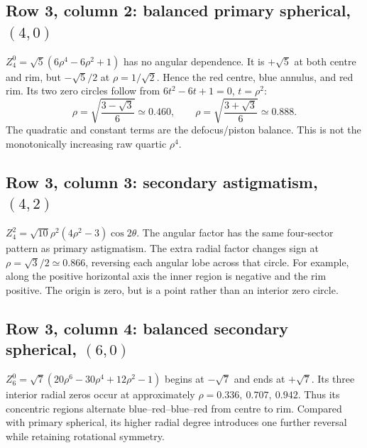 \subsection*{Row 3, column 2: balanced primary spherical, $(4,0)$}
$Z_4^0=\sqrt5(6\rho^4-6\rho^2+1)$ has no angular dependence. It is $+\sqrt5$ at both centre and rim, but $-\sqrt5/2$ at $\rho=1/\sqrt2$. Hence the red centre, blue annulus, and red rim. Its two zero circles follow from $6t^2-6t+1=0$, $t=\rho^2$:
\begin{equation}
\rho=\sqrt{\frac{3-\sqrt3}{6}}\simeq0.460,
\qquad \rho=\sqrt{\frac{3+\sqrt3}{6}}\simeq0.888.
\end{equation}
The quadratic and constant terms are the defocus/piston balance. This is not the monotonically increasing raw quartic $\rho^4$.

\subsection*{Row 3, column 3: secondary astigmatism, $(4,2)$}
$Z_4^2=\sqrt{10}\rho^2(4\rho^2-3)\cos2\theta$. The angular factor has the same four-sector pattern as primary astigmatism. The extra radial factor changes sign at $\rho=\sqrt3/2\simeq0.866$, reversing each angular lobe across that circle. For example, along the positive horizontal axis the inner region is negative and the rim positive. The origin is zero, but is a point rather than an interior zero circle.

\subsection*{Row 3, column 4: balanced secondary spherical, $(6,0)$}
$Z_6^0=\sqrt7(20\rho^6-30\rho^4+12\rho^2-1)$ begins at $-\sqrt7$ and ends at $+\sqrt7$. Its three interior radial zeros occur at approximately $\rho=0.336,\ 0.707,\ 0.942$. Thus its concentric regions alternate blue--red--blue--red from centre to rim. Compared with primary spherical, its higher radial degree introduces one further reversal while retaining rotational symmetry.


